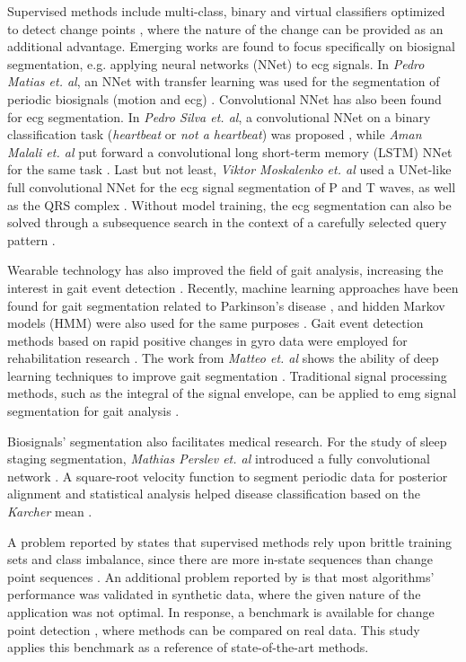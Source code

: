 Supervised methods include multi-class, binary and virtual classifiers optimized to detect change points \cite{review_1}, where the nature of the change can be provided as an additional advantage. Emerging works are found to focus specifically on biosignal segmentation, e.g. applying neural networks (NNet) to \gls{ecg} signals. In \textit{Pedro Matias et. al}, an NNet with transfer learning was used for the segmentation of periodic biosignals (motion and \gls{ecg}) \cite{pedromatias}.  Convolutional NNet has also been found for \gls{ecg} segmentation. In \textit{Pedro Silva et. al}, a convolutional NNet on a binary classification task (\textit{heartbeat} or \textit{not a heartbeat}) was proposed \cite{ecg_segmentation}, while \textit{Aman Malali et. al} put forward a convolutional long short-term memory (LSTM) NNet for the same task \cite{ecg_segmentation2}. Last but not least, \textit{Viktor Moskalenko et. al} used a UNet-like full convolutional NNet for the \gls{ecg} signal segmentation of P and T waves, as well as the QRS complex \cite{ecg_segmentation3}. Without model training, the \gls{ecg} segmentation can also be solved through a subsequence search in the context of a carefully selected query pattern \cite{folgado2022tssearch}.

Wearable technology has also improved the field of gait analysis, increasing the interest in gait event detection \cite{gait_deep}. Recently, machine learning approaches have been found for gait segmentation related to Parkinson's disease \cite{deep_learning_gait}, and hidden Markov models (HMM) were also used for the same purposes \cite{hmm_gait}. Gait event detection methods based on rapid positive changes in \gls{gyro} data were employed for rehabilitation research \cite{gait_rehab, gait_rehab2}. The work from \textit{Matteo et. al} shows the ability of deep learning techniques to improve gait segmentation \cite{gait_deep}. Traditional signal processing methods, such as the integral of the signal envelope, can be applied to \gls{emg} signal segmentation for gait analysis \cite{emg_segmentation}.

Biosignals' segmentation also facilitates medical research. For the study of sleep staging segmentation, \textit{Mathias Perslev et. al} introduced a fully convolutional network \cite{u_net}. A square-root velocity function to segment periodic data for posterior alignment and statistical analysis helped disease classification based on the \textit{Karcher} mean \cite{segmentation_align}. 

A problem reported by \cite{review_1} states that supervised methods rely upon brittle training sets and class imbalance, since there are more in-state sequences than change point sequences \cite{review_1}. An additional problem reported by \cite{cpd_alan} is that most algorithms' performance was validated in synthetic data, where the given nature of the application was not optimal. In response, a benchmark is available for change point detection \cite{cpd_alan}, where methods can be compared on real data. This study applies this benchmark as a reference of state-of-the-art methods.

